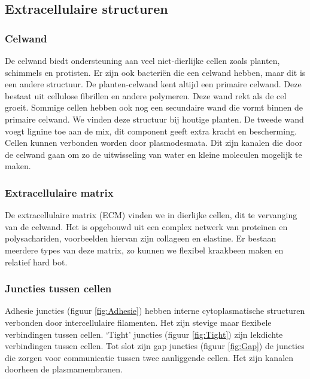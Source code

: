 \documentclass[a4paper,kul]{kulakarticle} %
\begin{document}
\subsection{Extracellulaire structuren}
\subsubsection{Celwand}
De celwand biedt ondersteuning aan veel niet-dierlijke cellen zoals planten, schimmels en protisten. Er zijn ook bacteriën die een celwand hebben, maar dit is een andere structuur. De planten-celwand kent  altijd een primaire celwand. Deze bestaat uit cellulose fibrillen en andere polymeren. Deze wand rekt als de cel groeit. Sommige cellen hebben ook nog een secundaire wand die vormt binnen de primaire celwand. We vinden deze structuur bij houtige planten. De tweede wand voegt lignine toe aan de mix, dit component geeft extra kracht en bescherming. Cellen kunnen verbonden worden door plasmodesmata. Dit zijn kanalen die door de celwand gaan om zo de uitwisseling van water en kleine moleculen mogelijk te maken.
\subsubsection{Extracellulaire matrix}
De extracellulaire matrix (ECM) vinden we in dierlijke cellen, dit te vervanging van de celwand. Het is opgebouwd uit een complex netwerk van proteïnen en polysachariden, voorbeelden hiervan zijn collageen en elastine. Er bestaan meerdere types van deze matrix, zo kunnen we flexibel kraakbeen maken en relatief hard bot. 
\subsubsection{Juncties tussen cellen}
Adhesie juncties (figuur \ref{fig:Adhesie}) hebben interne cytoplasmatische structuren verbonden door intercellulaire filamenten. Het zijn stevige maar flexibele verbindingen tussen cellen. `Tight' juncties (figuur \ref{fig:Tight}) zijn lekdichte verbindingen tussen cellen. Tot slot zijn gap juncties (figuur \ref{fig:Gap}) de juncties die zorgen voor communicatie tussen twee aanliggende cellen. Het zijn kanalen doorheen de plasmamembranen.   
\end{document}
